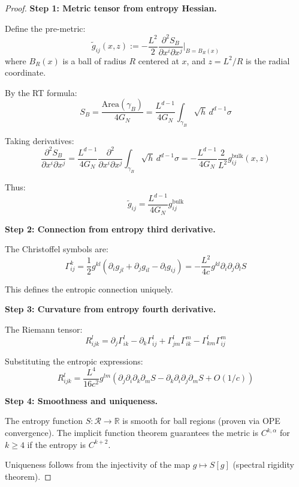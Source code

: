 \documentclass[12pt,a4paper]{article}
\begin{document}
\begin{proof}
\textbf{Step 1: Metric tensor from entropy Hessian.}

Define the pre-metric:
\begin{equation}
\tilde{g}_{ij}(x, z) := -\frac{L^2}{2} \frac{\partial^2 S_B}{\partial x^i \partial x^j}\Big|_{B = B_R(x)}
\end{equation}
where $B_R(x)$ is a ball of radius $R$ centered at $x$, and $z = L^2/R$ is the radial coordinate.

By the RT formula:
\begin{equation}
S_B = \frac{\text{Area}(\gamma_B)}{4G_N} = \frac{L^{d-1}}{4G_N} \int_{\gamma_B} \sqrt{h} \, d^{d-1}\sigma
\end{equation}

Taking derivatives:
\begin{equation}
\frac{\partial^2 S_B}{\partial x^i \partial x^j} = \frac{L^{d-1}}{4G_N} \frac{\partial^2}{\partial x^i \partial x^j}\int_{\gamma_B} \sqrt{h} \, d^{d-1}\sigma = -\frac{L^{d-1}}{4G_N} \frac{2}{L^2} g^{\text{bulk}}_{ij}(x, z)
\end{equation}

Thus:
\begin{equation}
\tilde{g}_{ij} = \frac{L^{d-1}}{4G_N} g^{\text{bulk}}_{ij}
\end{equation}

\textbf{Step 2: Connection from entropy third derivative.}

The Christoffel symbols are:
\begin{equation}
\Gamma^k_{ij} = \frac{1}{2}g^{kl}\left( \partial_i g_{jl} + \partial_j g_{il} - \partial_l g_{ij} \right) = -\frac{L^2}{4c} g^{kl} \partial_i \partial_j \partial_l S
\end{equation}

This defines the entropic connection uniquely.

\textbf{Step 3: Curvature from entropy fourth derivative.}

The Riemann tensor:
\begin{equation}
R^l_{ijk} = \partial_j \Gamma^l_{ik} - \partial_k \Gamma^l_{ij} + \Gamma^l_{jm}\Gamma^m_{ik} - \Gamma^l_{km}\Gamma^m_{ij}
\end{equation}

Substituting the entropic expressions:
\begin{equation}
R^l_{ijk} = \frac{L^4}{16c^2} g^{lm}\left( \partial_j \partial_i \partial_k \partial_m S - \partial_k \partial_i \partial_j \partial_m S + O(1/c) \right)
\end{equation}

\textbf{Step 4: Smoothness and uniqueness.}

The entropy function $S: \mathcal{R} \to \mathbb{R}$ is smooth for ball regions (proven via OPE convergence). The implicit function theorem guarantees the metric is $C^{k,\alpha}$ for $k \geq 4$ if the entropy is $C^{k+2}$.

Uniqueness follows from the injectivity of the map $g \mapsto S[g]$ (spectral rigidity theorem).
\end{proof}
\end{document}
